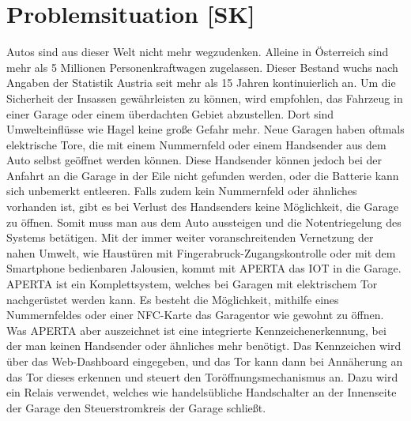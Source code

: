 \section{Problemsituation [SK]}
Autos sind aus dieser Welt nicht mehr wegzudenken. Alleine in Österreich sind mehr als 5 Millionen Personenkraftwagen zugelassen. Dieser Bestand wuchs nach Angaben der Statistik Austria seit mehr als 15 Jahren kontinuierlich an.\cite{StatAustPKW} Um die Sicherheit der Insassen gewährleisten zu können, wird empfohlen, das Fahrzeug in einer Garage oder einem überdachten Gebiet abzustellen. Dort sind Umwelteinflüsse wie Hagel keine große Gefahr mehr. Neue Garagen haben oftmals elektrische Tore, die mit einem Nummernfeld oder einem Handsender aus dem Auto selbst geöffnet werden können. Diese Handsender können jedoch bei der Anfahrt an die Garage in der Eile nicht gefunden werden, oder die Batterie kann sich unbemerkt entleeren. Falls zudem kein Nummernfeld oder ähnliches vorhanden ist, gibt es bei Verlust des Handsenders keine Möglichkeit, die Garage zu öffnen. Somit muss man aus dem Auto aussteigen und die Notentriegelung des Systems betätigen.
Mit der immer weiter voranschreitenden Vernetzung der nahen Umwelt, wie Haustüren mit Fingerabruck-Zugangskontrolle oder mit dem Smartphone bedienbaren Jalousien, kommt mit APERTA das IOT in die Garage.
APERTA ist ein Komplettsystem, welches bei Garagen mit elektrischem Tor nachgerüstet werden kann. Es besteht die Möglichkeit, mithilfe eines Nummernfeldes oder einer NFC-Karte das Garagentor wie gewohnt zu öffnen. Was APERTA aber auszeichnet ist eine integrierte Kennzeichenerkennung, bei der man keinen Handsender oder ähnliches mehr benötigt. Das Kennzeichen wird über das Web-Dashboard eingegeben, und das Tor kann dann bei Annäherung an das Tor dieses erkennen und steuert den Toröffnungsmechanismus an. Dazu wird ein Relais verwendet, welches wie handelsübliche Handschalter an der Innenseite der Garage den Steuerstromkreis der Garage schließt.

